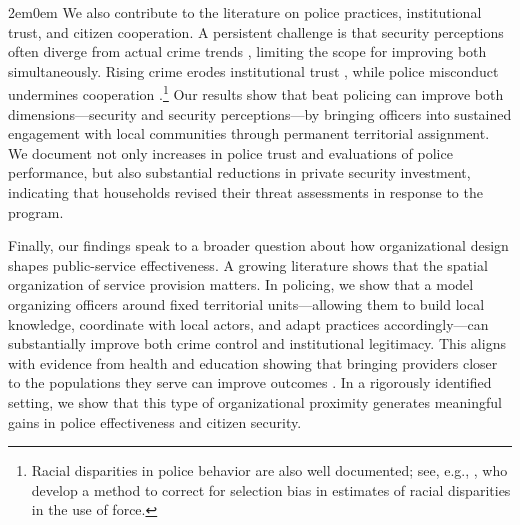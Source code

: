 \begin{adjustwidth}{2em}{0em}
We also contribute to the literature on police practices, institutional trust, and citizen cooperation. A persistent challenge is that security perceptions often diverge from actual crime trends \citep{ajzenman2022}, limiting the scope for improving both simultaneously. Rising crime erodes institutional trust \citep{Blanco_2025}, while police misconduct undermines cooperation \citep{ang_etal_2025}.\footnote{Racial disparities in police behavior are also well documented; see, e.g., \citet{Goncalves_etal_2025}, who develop a method to correct for selection bias in estimates of racial disparities in the use of force.} Our results show that beat policing can improve both dimensions---security and security perceptions---by bringing officers into sustained engagement with local communities through permanent territorial assignment. We document not only increases in police trust and evaluations of police performance, but also substantial reductions in private security investment, indicating that households revised their threat assessments in response to the program. 

Finally, our findings speak to a broader question about how organizational design shapes public-service effectiveness. A growing literature shows that the spatial organization of service provision matters. In policing, we show that a model organizing officers around fixed territorial units---allowing them to build local knowledge, coordinate with local actors, and adapt practices accordingly---can substantially improve both crime control and institutional legitimacy. This aligns with evidence from health and education showing that bringing providers closer to the populations they serve can improve outcomes \citep{besley2003centralized, Bardhan, Bloom_2015, Basurto}. In a rigorously identified setting, we show that this type of organizational proximity generates meaningful gains in police effectiveness and citizen security.

\end{adjustwidth}


